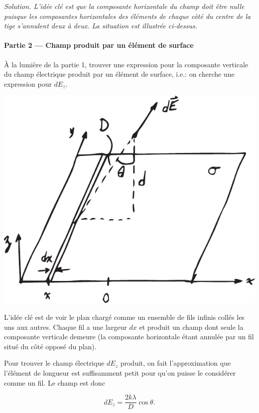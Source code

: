 \textit{Solution. L'idée clé est que la composante horizontale du champ doit
  être nulle puisque les composantes horizontales des éléments de chaque côté
  du centre de la tige s'annulent deux à deux. La situation est illustrée
  ci-dessus.}

\paragraph{Partie 2 --- Champ produit par un élément de surface}

À la lumière de la partie 1, trouver une expression pour la composante
verticale du champ électrique produit par un élément de surface, i.e.: on
cherche une expression pour $dE_z$.

\begin{center}
  \includegraphics[scale=0.5]{02-champ-electrique/figures/champ-plaque-uniforme-2.pdf}
\end{center}

L'idée clé est de voir le plan chargé comme un ensemble de fils infinis collés
les uns aux autres. Chaque fil a une largeur $dx$ et produit un champ dont
seule la composante verticale demeure (la composante horizontale étant annulée
par un fil situé du côté opposé du plan).

Pour trouver le champ électrique $dE_z$ produit, on fait l'approximation que
l'élément de longueur est suffisamment petit pour qu'on puisse le considérer
comme un fil. Le champ est donc

$$d E_z = \frac{2k \lambda}{D} \cos\theta.$$

